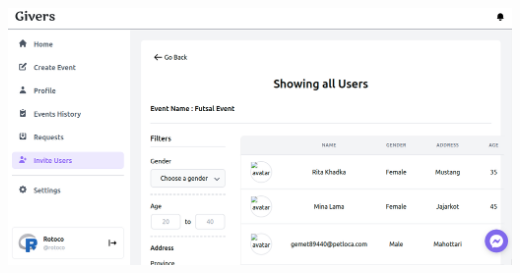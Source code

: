 \documentclass[12pt]{article}
\begin{document}
\begin{enumerate}
	\includegraphics[scale = 0.35]{user/invited_user1.png}
	
\end{enumerate}
	

\clearpage
\clearpage
\end{document}
